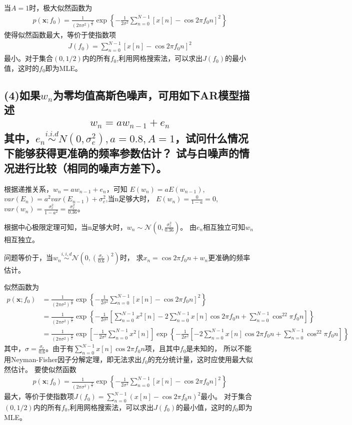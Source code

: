 \documentclass[fontset=windows]{article}
\numberwithin{figure}{section}
\begin{document}
当\(A=1\)时，极大似然函数为
\begin{align*}
	p(\mathbf{x};f_0)=\frac{1}{(2\pi \sigma^2)^{\frac{N}{2}}}
	\exp\left\{-\frac{1}{2\sigma^2}\sum_{n=0}^{N-1}\left[x[n]-\cos2\pi f_0n\right]^2\right\}
\end{align*}
使得似然函数最大，等价于使指数项
\begin{align*}
	J(f_0)=\sum_{n=0}^{N-1}\left[x[n]-\cos2\pi f_0n\right]^2
\end{align*}
最小。对于集合\((0,1/2)\)内的所有\(f_0\),利用网格搜索法，可以求出\(J(f_0)\)的最小值，这时的\(f_0\)即为MLE。

\subsection*{(4)如果\(w_n\)为零均值高斯色噪声，可用如下AR模型描述
	\begin{align*}
		w_n=aw_{n-1}+e_n
	\end{align*}
	其中，\(e_n\overset{i.i.d}{\sim}N(0,\sigma_e^2),a=0.8,A=1\)，试问什么情况下能够获得更准确的频率参数估计？
	试与白噪声的情况进行比较（相同的噪声方差下）。}

根据递推关系，\(w_n=aw_{n-1}+e_n\)，可知
\(E(w_n)=aE(w_{n-1})\),\(var(E_n)=a^2var(E_{n-1})+\sigma_e^2\),当n足够大时，
\(E(w_n)=\frac{0}{1-a}=0\),\(var(w_n)=\frac{\sigma_e^2}{1-a^2}=\frac{\sigma_e^2}{0.36}\)。

根据中心极限定理可知，当n足够大时，\(w_n\sim\mathcal{N}(0,\frac{\sigma_e^2}{0.36})\)。
由\(e_n\)相互独立可知\(w_n\)相互独立。

问题等价于，当\(w_n\overset{i,i,d}{\sim}\mathcal{N}\left(0,\left( \frac{\sigma_e}{0.6}\right)^2\right)\)时，
求\(x_n=\cos2\pi f_0 n +w_n\)更准确的频率估计。

似然函数为
\begin{align*}
	p(\mathbf{x};f_0) & =\frac{1}{(2\pi \sigma^2)^{\frac{N}{2}}}
	\exp\left\{-\frac{1}{2\sigma^2}\sum_{n=0}^{N-1}\left[x[n]-\cos2\pi f_0n\right]^2\right\} \\
	                  & =\frac{1}{(2\pi \sigma^2)^{\frac{N}{2}}}
	\exp\left\{-\frac{1}{2\sigma^2}\left[\sum_{n=0}^{N-1}x^2[n]-
	2\sum_{n=0}^{N-1}x[n]\cos2\pi f_0 n+\sum_{n=0}^{N-1}\cos^22\pi f_0 n
	\right]\right\}                                                                          \\
	                  & =\frac{1}{(2\pi \sigma^2)^{\frac{N}{2}}}
	\exp\left[-\frac{1}{2\sigma^2}\sum_{n=0}^{N-1}x^2[n]\right]
	\exp\left\{-\frac{1}{2\sigma^2}\left[-
	2\sum_{n=0}^{N-1}x[n]\cos2\pi f_0 n+\sum_{n=0}^{N-1}\cos^22\pi f_0 n
	\right]\right\}
\end{align*}
其中，\(\sigma=\frac{\sigma_e}{0.6}\)。由于有\(\sum_{n=0}^{N-1}x[n]\cos2\pi f_0 n\)项，且其中\(f_0\)是未知的，
所以不能用Neyman-Fisher因子分解定理，即无法求出\(f_0\)的充分统计量，这时应使用最大似然估计。
要使似然函数
\begin{align*}
	p(\mathbf{x};f_0)=\frac{1}{(2\pi \sigma^2)^{\frac{N}{2}}}
	\exp\left\{-\frac{1}{2\sigma^2}\sum_{n=0}^{N-1}\left[x[n]-\cos2\pi f_0n\right]^2\right\}
\end{align*}
最大，等价于使指数项\(J(f_0)=\sum_{n=0}^{N-1}\left(x[n]-\cos2\pi f_0 n\right)^2\)最小。
对于集合\((0,1/2)\)内的所有\(f_0\),利用网格搜索法，可以求出\(J(f_0)\)的最小值，这时的\(f_0\)即为MLE。
\end{document}
